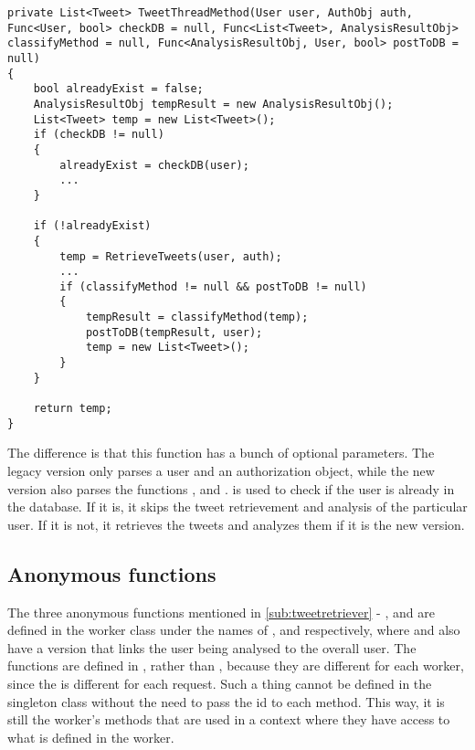 \begin{minipage}[H]{\linewidth}
\begin{lstlisting}[caption = The TweetThreadMethod function, label =
tweetthreadmethod]
private List<Tweet> TweetThreadMethod(User user, AuthObj auth, Func<User, bool> checkDB = null, Func<List<Tweet>, AnalysisResultObj> classifyMethod = null, Func<AnalysisResultObj, User, bool> postToDB = null)
{
    bool alreadyExist = false;
    AnalysisResultObj tempResult = new AnalysisResultObj();
    List<Tweet> temp = new List<Tweet>();
    if (checkDB != null)
    {
        alreadyExist = checkDB(user);
		...
    }

    if (!alreadyExist)
    {
        temp = RetrieveTweets(user, auth);
		...	
        if (classifyMethod != null && postToDB != null)
        {
            tempResult = classifyMethod(temp); 
            postToDB(tempResult, user); 
            temp = new List<Tweet>();
        }
    }

    return temp;
}
\end{lstlisting}
\end{minipage}
The difference is that this function has a bunch of optional parameters. The legacy version only parses
a user and an authorization object, while the new version also parses the
functions ,  and .
 is used to check if the user is already in the database. If it
is, it skips the tweet retrievement and analysis of the particular user. If it is not, it retrieves the tweets and analyzes them if it
is the new version.\\

\subsection{Anonymous functions}
The three anonymous functions mentioned in \autoref{sub:tweetretriever} -
,  and  are defined in the
worker class under the names of ,
 and  respectively, where
 and  also have a version
that links the user being analysed to the overall user. The functions are
defined in , rather than , because they are
different for each worker, since the  is different for each
request. Such a thing cannot be defined in the singleton class without the need
to pass the id to each method.
This way, it is still the worker's methods that are used in a context where they
have access to what is defined in the worker.

